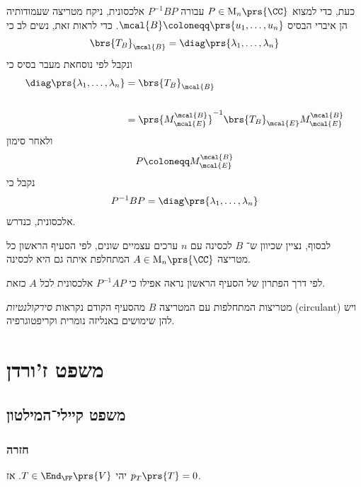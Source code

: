 \documentclass[a4paper,10pt,twoside,openany]{book}
\renewcommand{\Mat}{\mathrm{M}}
\begin{document}
\begin{solution}
\begin{enumerate}
כעת, כדי למצוא
$P \in \Mat_n\prs{\CC}$
עבורה
$P^{-1} B P$
אלכסונית, ניקח מטריצה שעמודותיה הן איברי הבסיס
$\mcal{B} \coloneqq \prs{u_1, \ldots, u_n}$.
כדי לראות זאת, נשים לב כי
\begin{align*}
\brs{T_B}_{\mcal{B}} = \diag\prs{\lambda_1, \ldots, \lambda_n}
\end{align*}
ונקבל לפי נוסחאת מעבר בסיס כי
\begin{align*}
\diag\prs{\lambda_1, \ldots, \lambda_n} &= \brs{T_B}_{\mcal{B}}
\\
\\&=
\prs{M^{\mcal{B}}_{\mcal{E}}}^{-1} \brs{T_B}_{\mcal{E}} M^{\mcal{B}}_{\mcal{E}}
\end{align*}
ולאחר סימון
\begin{align*}
P \coloneqq M^{\mcal{B}}_{\mcal{E}}
\end{align*}
נקבל כי
\begin{align*}
P^{-1} B P = \diag\prs{\lambda_1, \ldots, \lambda_n}
\end{align*}
אלכסונית, כנדרש.

לבסוף, נציין שכיוון ש־%
$B$
לכסינה עם
$n$
ערכים עצמיים שונים, לפי הסעיף הראשון כל מטריצה
$A \in \Mat_n\prs{\CC}$
המתחלפת איתה גם היא לכסינה.

לפי דרך הפתרון של הסעיף הראשון נראה אפילו כי
$P^{-1} A P$
אלכסונית לכל
$A$
כזאת.
\end{enumerate}
\end{solution}

\begin{remark}
מטריצות המתחלפות עם המטריצה
$B$
מהסעיף הקודם נקראות
\emph{סירקולנטיות}
\textenglish{(circulant)}
ויש להן שימושים באנליזה נומרית וקריפטוגרפיה.
\end{remark}

\chapter{משפט ז'ורדן}

\section{משפט קיילי־המילטון}

\subsection{חזרה}

\begin{theorem}
יהי
$T \in \End_\FF\prs{V}$.
אז
$p_T\prs{T} = 0$.
\end{theorem}
\end{document}
